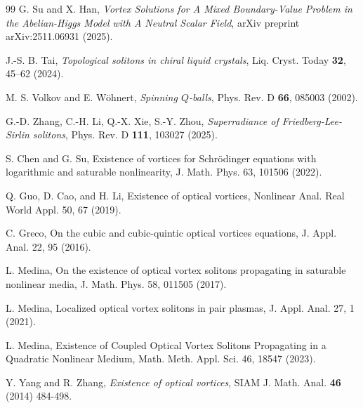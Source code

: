 \documentclass[12pt]{article}
\begin{document}
{\begin{thebibliography}{99}
		G. Su and X. Han, \textit{Vortex Solutions for A Mixed Boundary-Value Problem in the Abelian-Higgs Model with A Neutral Scalar Field}, arXiv preprint arXiv:2511.06931 (2025).

		J.-S. B. Tai, \textit{Topological solitons in chiral liquid crystals}, Liq. Cryst. Today \textbf{32}, 45–62 (2024).

		 M. S. Volkov and E. W\"ohnert, \textit{Spinning $Q$-balls}, Phys. Rev. D \textbf{66}, 085003 (2002).
		
		G.-D. Zhang, C.-H. Li, Q.-X. Xie, S.-Y. Zhou, \textit{Superradiance of Friedberg-Lee-Sirlin solitons}, Phys. Rev. D \textbf{111}, 103027 (2025).

        S. Chen and G. Su, Existence of vortices for Schr\"odinger equations with logarithmic and saturable nonlinearity, J. Math. Phys. 63, 101506 (2022).

        Q. Guo, D. Cao, and H. Li, Existence of optical vortices, Nonlinear Anal. Real World Appl. 50, 67 (2019).

        C. Greco, On the cubic and cubic-quintic optical vortices equations, J. Appl. Anal. 22, 95 (2016).

        L. Medina, On the existence of optical vortex solitons propagating in saturable nonlinear media, J. Math. Phys. 58, 011505 (2017).
        
        L. Medina, Localized optical vortex solitons in pair plasmas, J. Appl. Anal. 27, 1 (2021).

        L. Medina, Existence of Coupled Optical Vortex Solitons Propagating in a Quadratic Nonlinear Medium, Math. Meth. Appl. Sci. 46, 18547 (2023).

        Y. Yang and R. Zhang, \textit{Existence of optical vortices}, SIAM J. Math. Anal. \textbf{46} (2014) 484-498.
		
	\end{thebibliography}
}
	
\end{document}
